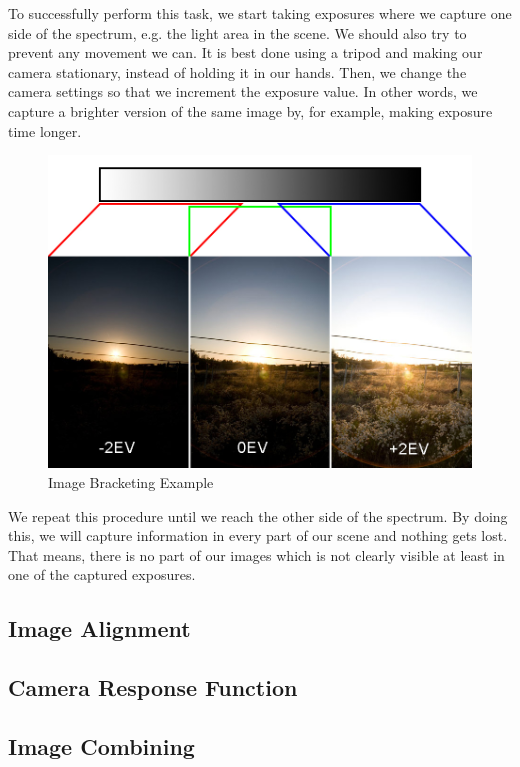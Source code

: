 \documentclass{article}
\begin{document}
To successfully perform this task, we start taking exposures where we capture one side of the spectrum, e.g. the light area in the scene.
We should also try to prevent any movement we can. 
It is best done using a tripod and making our camera stationary, instead of holding it in our hands.
Then, we change the camera settings so that we increment the exposure value. 
In other words, we capture a brighter version of the same image by, for example, making exposure time longer.

\begin{figure}[h!]
    \centering
    \includegraphics[width = 1.0\linewidth]{images/spectrum3.jpg}
    \caption{Image Bracketing Example \cite{bracketing:Example}}
    \label{fig:imageBracketing}
\end{figure}

We repeat this procedure until we reach the other side of the spectrum.
By doing this, we will capture information in every part of our scene and nothing gets lost.
That means, there is no part of our images which is not clearly visible at least in one of the captured exposures.

\subsection{Image Alignment}
\subsection{Camera Response Function}
\subsection{Image Combining}
\end{document}
